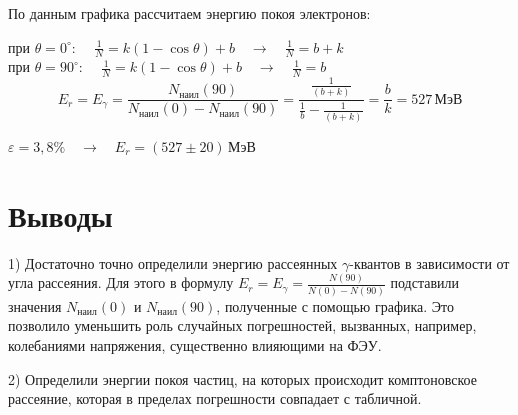 \documentclass[a4paper,12pt]{article}
\begin{document}
По данным графика рассчитаем энергию покоя электронов:

при $\theta=0^\circ$: $\quad\frac{1}{N}=k(1-\cos\theta)+b\quad\rightarrow\quad\frac{1}{N}=b+k$\\

при $\theta=90^\circ$: $\quad\frac{1}{N}=k(1-\cos\theta)+b\quad\rightarrow\quad\frac{1}{N}=b$\\
\begin{equation}
	E_r = E_{\gamma}=\frac{N_\text{наил}(90)}{N_\text{наил}(0)-N_\text{наил}(90)} = \frac{\frac{1}{(b+k)}}{\frac{1}{b}-\frac{1}{(b+k)}}=\frac{b}{k}=527 \, \text{МэВ}
\end{equation}

$\varepsilon=3,8\%\quad\rightarrow\quad E_r=(527\pm20) \, \text{МэВ}$
\section{Выводы}

1) Достаточно точно определили энергию рассеянных $\gamma$-квантов в зависимости
от угла рассеяния. Для этого в формулу $E_r= E_{\gamma}=\frac{N(90)}{N(0)-N(90)}$
подставили значения $N_\text{наил}(0)$ и $N_\text{наил}(90)$, полученные с помощью
графика. Это позволило уменьшить роль случайных погрешностей, вызванных, например,
колебаниями напряжения, существенно влияющими на ФЭУ.

2) Определили энергии покоя частиц, на которых происходит комптоновское рассеяние,
которая в пределах погрешности совпадает с табличной.
					
\end{document}
